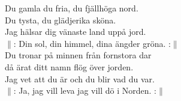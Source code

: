\documentclass[a6paper,10pt]{article}
\begin{document}
\noindent
{}
\small
\begin{center}
\end{center}
\begin{lyrics}
Du gamla du fria, du fjällhöga nord. \\
Du tysta, du glädjerika sköna. \\
Jag hälsar dig vänaste land uppå jord.\\
$\|$: Din sol, din himmel, dina ängder gröna. :$\|$\\
\newline
Du tronar på minnen från fornstora dar\\
då ärat ditt namn flög över jorden.\\
Jag vet att du är och du blir vad du var.\\
$\|$: Ja, jag vill leva jag vill dö i Norden. :$\|$\\
\end{lyrics}
\end{document}
